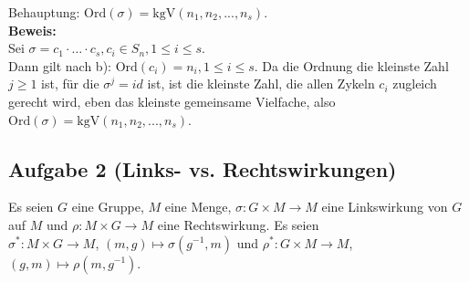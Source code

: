 \documentclass[11pt,a4paper,ngerman]{article}
\newcommand{\kgV}{\text{kgV}}
\newcommand{\ord}{\text{Ord}}
\begin{document}
\begin{enumerate}[\bfseries a)]
Behauptung: $\ord(\sigma) = \kgV(n_1, n_2, ..., n_s)$. \\
\textbf{Beweis:}\\
Sei $\sigma = c_1 \cdot \ldots \cdot c_s, c_i \in S_n, 1 \leq i \leq s$. \\
Dann gilt nach b): $\ord(c_i) = n_i, 1 \leq i \leq s$. Da die Ordnung die kleinste Zahl $j \geq 1$ ist, für die $\sigma^j = id$ ist, ist die kleinste Zahl, die allen Zykeln $c_i$ zugleich gerecht wird, eben das kleinste gemeinsame Vielfache, also $\ord(\sigma) = \kgV(n_1, n_2, ..., n_s)$.
\end{enumerate}




\subsection*{Aufgabe 2 \mdseries (Links- vs. Rechtswirkungen)}
Es seien $G$ eine Gruppe, $M$ eine Menge,
$\sigma : G \times M \to M$ eine Linkswirkung von $G$ auf $M$ und
$\rho : M \times G \to M$ eine Rechtswirkung. Es seien \\
 $\sigma^{*}: M \times G \to M$, $(m,g) \mapsto \sigma(g^{-1},m)$ und 
$\rho^{*}: G \times M \to M$, $(g,m) \mapsto \rho(m, g^{-1})$.
\end{document}
